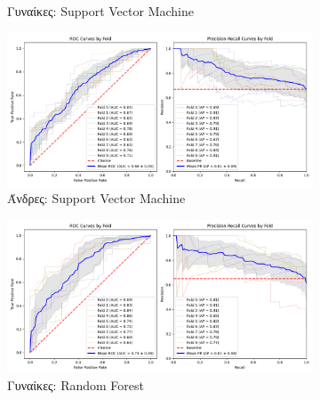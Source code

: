 \documentclass[12pt]{report}
\begin{document}
\begin{figure}[ht]
\begin{subfigure}[b]{0.48\textwidth}
                        \caption{Γυναίκες: Support Vector Machine}
                        \label{stratified_Female_50-70_SVM_useSMOTE_False_k_fold_validation}
                    \end{subfigure}
                    \hfill
                    \begin{subfigure}[b]{0.48\textwidth}
                        \includegraphics[width=\textwidth]{ML/CV/stratified_Male_50-70_SVM_useSMOTE_False_k_fold_validation.png}
                        \caption{Άνδρες: Support Vector Machine}
                        \label{stratified_Male_50-70_SVM_useSMOTE_False_k_fold_validation}
                    \end{subfigure}
                    \vspace{0.5cm}
                    \begin{subfigure}[b]{0.48\textwidth}
                        \includegraphics[width=\textwidth]{ML/CV/stratified_Female_50-70_RF_useSMOTE_False_k_fold_validation.png}
                        \caption{Γυναίκες: Random Forest}
                        \label{stratified_Female_50-70_RF_useSMOTE_False_k_fold_validation}
                    \end{subfigure}
                    \hfill
                    \begin{subfigure}[b]{0.48\textwidth}

\end{subfigure}
\end{figure}
\end{document}
